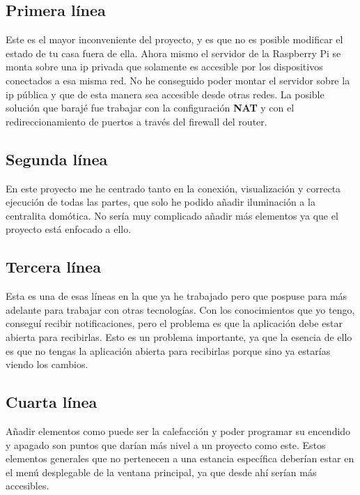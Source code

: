 \subsection{Primera línea}

Este es el mayor inconveniente del proyecto, y es que no es posible modificar el estado de tu casa fuera de ella. Ahora mismo el servidor de la Raspberry Pi se monta sobre una ip privada que solamente es accesible por los dispositivos conectados a esa misma red.
No he conseguido poder montar el servidor sobre la ip pública y que de esta manera sea accesible desde otras redes. 
La posible solución que barajé fue trabajar con la configuración \textbf{NAT} y con el redireccionamiento de puertos a través del firewall del router.

\subsection{Segunda línea}

En este proyecto me he centrado tanto en la conexión, visualización y correcta ejecución de todas las partes, que solo he podido añadir iluminación a la centralita domótica. No sería muy complicado añadir más elementos ya que el proyecto está enfocado a ello.

\subsection{Tercera línea}
Esta es una de esas líneas en la que ya he trabajado pero que pospuse para más adelante para trabajar con otras tecnologías. Con los conocimientos que yo tengo, conseguí recibir notificaciones, pero el problema es que la aplicación debe estar abierta para recibirlas. Esto es un problema importante, ya que la esencia de ello es que no tengas la aplicación abierta para recibirlas porque sino ya estarías viendo los cambios.

\subsection{Cuarta línea}
Añadir elementos como puede ser la calefacción y poder programar su encendido  y apagado son puntos que darían más nivel a un proyecto como este. Estos elementos generales que no pertenecen a una estancia específica deberían estar en el menú desplegable de la ventana principal, ya que desde ahí serían más accesibles.